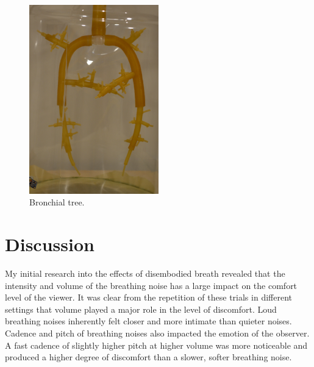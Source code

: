 \documentclass[letterpaper]{article}
\begin{document}
\begin{figure}[h]
\includegraphics[width=0.5\textwidth]{images/closeupbronchialtree.JPG}
\caption{Bronchial tree.}
\end{figure}



\section{Discussion}

My initial research into the effects of disembodied breath revealed that the intensity and volume of the breathing noise has a large impact on the comfort level of the viewer. It was clear from the repetition of these trials in different settings that volume played a major role in the level of discomfort. Loud breathing noises inherently felt closer and more intimate than quieter noises. Cadence and pitch of breathing noises also impacted the emotion of the observer. A fast cadence of slightly higher pitch at higher volume was more noticeable and produced a higher degree of discomfort than a slower, softer breathing noise. 
\end{document}
